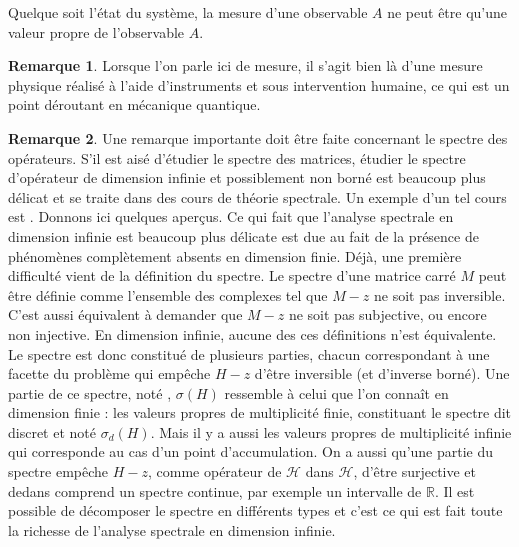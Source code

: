 \documentclass[12pt,openany,a4paper, titlepage]{article}
\newcommand{\R}{\mathbb{R}}
\theoremstyle{definition}
\theoremstyle{definition}
\theoremstyle{definition}
\theoremstyle{definition}
\theoremstyle{definition}
\newtheorem{rem}{Remarque}
\theoremstyle{definition}
\begin{document}
\vspace{3mm}
\begin{tcolorbox}[colback=gray!5!white,
                  colframe=gray!80!white,
                  title= Postulat 3 : Principe de quantification ]
Quelque soit l'état du système, la mesure d'une observable $A$ ne peut être qu'une valeur propre de l'observable $A$.
\end{tcolorbox}
\vspace{3mm}

\begin{rem}
    Lorsque l'on parle ici de mesure, il s'agit bien là d'une mesure physique réalisé à l'aide d'instruments et sous intervention humaine, ce qui est un point déroutant en mécanique quantique. 
\end{rem}

\begin{rem}
    Une remarque importante doit être faite concernant le spectre des opérateurs. S'il est aisé d'étudier le spectre des matrices, étudier le spectre d'opérateur de dimension infinie et possiblement non borné est beaucoup plus délicat et se traite dans des cours de théorie spectrale. Un exemple d'un tel cours est \cite{Macher}. Donnons ici quelques aperçus. Ce qui fait que l'analyse spectrale en dimension infinie est beaucoup plus délicate est due au fait de la présence de phénomènes complètement absents en dimension finie. Déjà, une première difficulté vient de la définition du spectre. Le spectre d'une matrice carré $M$ peut être définie comme l'ensemble des complexes tel que $M-z$ ne soit pas inversible. C'est aussi équivalent à demander que $M-z$ ne soit pas subjective, ou encore non injective. En dimension infinie, aucune des ces définitions n'est équivalente. Le spectre est donc constitué de plusieurs parties, chacun correspondant à une facette du problème qui empêche $H-z$ d'être inversible (et d'inverse borné). Une partie de ce spectre, noté , $\sigma(H)$ ressemble à celui que l'on connaît en dimension finie : les valeurs propres de multiplicité finie, constituant le spectre dit discret et noté $\sigma_d(H)$. Mais il y a aussi les valeurs propres de multiplicité infinie qui corresponde au cas d'un point d'accumulation. On a aussi qu'une partie du spectre empêche $H-z$, comme opérateur de $\mathcal{H}$ dans $\mathcal{H}$, d'être surjective et dedans comprend un spectre continue, par exemple un intervalle de $\R$. Il est possible de décomposer le spectre en différents types et c'est ce qui est fait toute la richesse de l'analyse spectrale en dimension infinie.
\end{rem}
\end{document}
